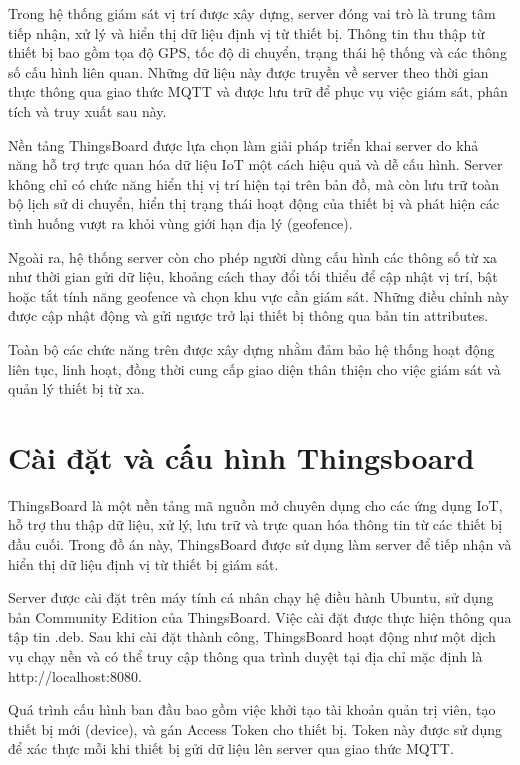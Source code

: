 \documentclass[../DoAn.tex]{subfiles}
\begin{document}
Trong hệ thống giám sát vị trí được xây dựng, server đóng vai trò là trung tâm tiếp nhận, xử lý và hiển thị dữ liệu định vị từ thiết bị. Thông tin thu thập từ thiết bị bao gồm tọa độ GPS, tốc độ di chuyển, trạng thái hệ thống và các thông số cấu hình liên quan. Những dữ liệu này được truyền về server theo thời gian thực thông qua giao thức MQTT và được lưu trữ để phục vụ việc giám sát, phân tích và truy xuất sau này.

Nền tảng ThingsBoard được lựa chọn làm giải pháp triển khai server do khả năng hỗ trợ trực quan hóa dữ liệu IoT một cách hiệu quả và dễ cấu hình. Server không chỉ có chức năng hiển thị vị trí hiện tại trên bản đồ, mà còn lưu trữ toàn bộ lịch sử di chuyển, hiển thị trạng thái hoạt động của thiết bị và phát hiện các tình huống vượt ra khỏi vùng giới hạn địa lý (geofence).

Ngoài ra, hệ thống server còn cho phép người dùng cấu hình các thông số từ xa như thời gian gửi dữ liệu, khoảng cách thay đổi tối thiểu để cập nhật vị trí, bật hoặc tắt tính năng geofence và chọn khu vực cần giám sát. Những điều chỉnh này được cập nhật động và gửi ngược trở lại thiết bị thông qua bản tin attributes.

Toàn bộ các chức năng trên được xây dựng nhằm đảm bảo hệ thống hoạt động liên tục, linh hoạt, đồng thời cung cấp giao diện thân thiện cho việc giám sát và quản lý thiết bị từ xa.

\section{Cài đặt và cấu hình Thingsboard}
\label{section:5.1}
ThingsBoard là một nền tảng mã nguồn mở chuyên dụng cho các ứng dụng IoT, hỗ trợ thu thập dữ liệu, xử lý, lưu trữ và trực quan hóa thông tin từ các thiết bị đầu cuối. Trong đồ án này, ThingsBoard được sử dụng làm server để tiếp nhận và hiển thị dữ liệu định vị từ thiết bị giám sát.

Server được cài đặt trên máy tính cá nhân chạy hệ điều hành Ubuntu, sử dụng bản Community Edition của ThingsBoard. Việc cài đặt được thực hiện thông qua tập tin .deb. Sau khi cài đặt thành công, ThingsBoard hoạt động như một dịch vụ chạy nền và có thể truy cập thông qua trình duyệt tại địa chỉ mặc định là http://localhost:8080.

Quá trình cấu hình ban đầu bao gồm việc khởi tạo tài khoản quản trị viên, tạo thiết bị mới (device), và gán Access Token cho thiết bị. Token này được sử dụng để xác thực mỗi khi thiết bị gửi dữ liệu lên server qua giao thức MQTT.
\end{document}
